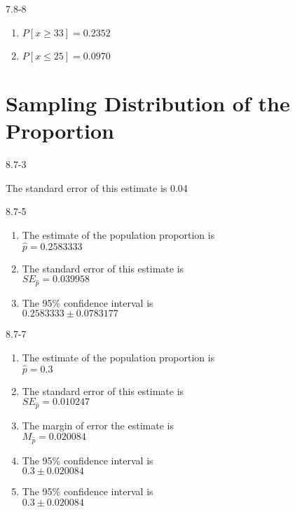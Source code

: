 \begin{exsol@solution}{7.8-8}



\begin{enumerate}
\item $P[ x \ge 33] = 0.2352$
\item $P[ x \le 25] = 0.0970$
\end{enumerate}

\end{exsol@solution}
\setcounter{chapter}{8}\chapter{Sampling Distribution of the Proportion}
\begin{exsol@solution}{8.7-3}

The standard error of this estimate is 0.04

\end{exsol@solution}
\begin{exsol@solution}{8.7-5}

\begin{enumerate}
\item	The estimate of the population proportion is \\ $ = 0.2583333$
\item	The standard error of this estimate is \\ $SE_{} = 0.039958$
\item	The 95\% confidence interval is \\ $0.2583333 $
\end{enumerate}
\end{exsol@solution}
\begin{exsol@solution}{8.7-7}

\begin{enumerate}
\item	The estimate of the population proportion is \\ $ = 0.3$
\item	The standard error of this estimate is \\ $SE_{} = 0.010247$
\item The margin of error the estimate is \\ $M_{} = 0.020084$
\item	The 95\% confidence interval is \\ $0.3 $
\item	The 95\% confidence interval is \\ $0.3 $
\end{enumerate}
\end{exsol@solution}
